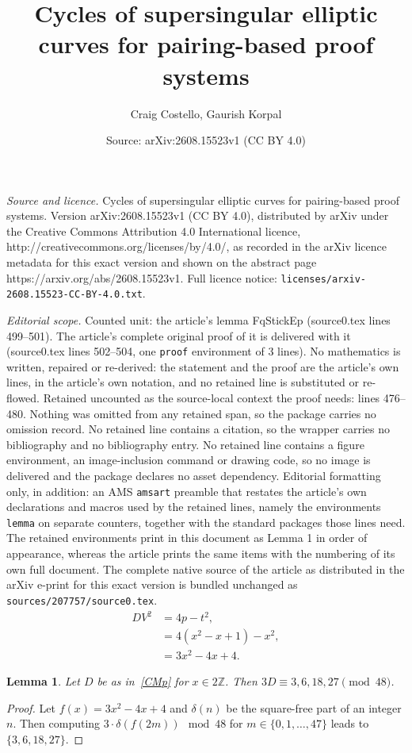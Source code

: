 \documentclass[10pt,a4paper]{amsart}
\title{Cycles of supersingular elliptic curves for pairing-based proof systems}
\author{Craig Costello, Gaurish Korpal}
\date{Source: arXiv:2608.15523v1 (CC BY 4.0)}
\newtheorem{lemma}{Lemma}
\newcommand{\Z}{\mathbb{Z}}
\begin{document}
\maketitle

\noindent\emph{Source and licence.} Cycles of supersingular elliptic curves for pairing-based proof systems. Version arXiv:2608.15523v1 (CC BY 4.0), distributed by arXiv under the Creative Commons Attribution 4.0 International licence, http://creativecommons.org/licenses/by/4.0/, as recorded in the arXiv licence metadata for this exact version and shown on the abstract page https://arxiv.org/abs/2608.15523v1. Full licence notice: \texttt{licenses/arxiv-2608.15523-CC-BY-4.0.txt}.\par\smallskip

\noindent\textit{Editorial scope.} Counted unit: the article's lemma FqStickEp (source0.tex lines 499--501). The article's complete original proof of it is delivered with it (source0.tex lines 502--504, one \texttt{proof} environment of 3 lines). No mathematics is written, repaired or re-derived: the statement and the proof are the article's own lines, in the article's own notation, and no retained line is substituted or re-flowed.  Retained uncounted as the source-local context the proof needs: lines 476--480.  Nothing was omitted from any retained span, so the package carries no omission record.  No retained line contains a citation, so the wrapper carries no bibliography and no bibliography entry.  No retained line contains a figure environment, an image-inclusion command or drawing code, so no image is delivered and the package declares no asset dependency.  Editorial formatting only, in addition: an AMS \texttt{amsart} preamble that restates the article's own declarations and macros used by the retained lines, namely the environments \texttt{lemma} on separate counters, together with the standard packages those lines need.  The retained environments print in this document as Lemma 1 in order of appearance, whereas the article prints the same items with the numbering of its own full document.  The complete native source of the article as distributed in the arXiv e-print for this exact version is bundled unchanged as \texttt{sources/207757/source0.tex}.
\begin{align}\label{CMp}
DV^2 &= 4p-t^2, \nonumber\\
	&=4(x^2-x+1) - x^2, \nonumber\\
	&=3x^2-4x+4. 
\end{align}

\begin{lemma}\label{FqStickEp}
	Let $D$ be as in~\eqref{CMp} for $x\in 2\Z$. Then $3D\equiv 3,6,18,27 \pmod {48}$.
\end{lemma}

\begin{proof}
	Let $f(x) = 3x^2 - 4x + 4$ and $\delta(n)$ be the square-free part of an integer $n$. Then computing $3\cdot \delta(f(2m)) \mod {48}$ for $m\in \{0,1,\ldots,47\}$ leads to $\{3,6,18,27\}$.  
\end{proof}
\end{document}
